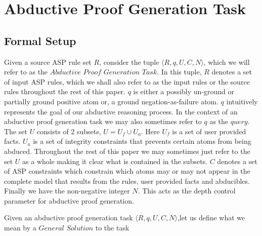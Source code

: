\section{Abductive Proof Generation Task}\label{sec:abductive_proof}

\subsection{Formal Setup}\label{formalsetup}


\begin{definition}\label{def:abductive_proof_generation_task}

Given a source ASP rule set $R$, consider the tuple $\langle R,q,U,C,N \rangle$, which we will refer to as the $\textit{Abductive Proof Generation Task}$. In this tuple,  $R$ denotes a set of input ASP rules, which we shall also refer to as the input rules or the source rules throughout the rest of this paper. $q$ is either a possibly un-ground or partially ground positive atom or, a ground negation-as-failure atom. $q$ intuitively represents the goal of our abductive reasoning process. In the context of an abductive proof generation task we may also sometimes refer to $q$ as the $query$. 
The set $U$ consists of 2 subsets, $U = U_{f} \cup U_{a}$. Here $U_{f}$ is a set of user provided facts. $U_{a}$ is a set of integrity constraints that prevents certain atoms from being abduced. Throughout the rest of this paper we may sometimes just refer to the set $U$ as a whole making it clear what is contained in the subsets. $C$ denotes a set of ASP constraints which constrain which atoms may or may not appear in the complete model that results from the rules, user provided facts and abducibles. Finally we have the non-negative integer $N$. This acts as the depth control parameter for abductive proof generation. 
 \end{definition}
Given an abductive proof generation task $\langle R,q,U,C,N \rangle$,let us define what we mean by a $\textit{General Solution}$ to the task

